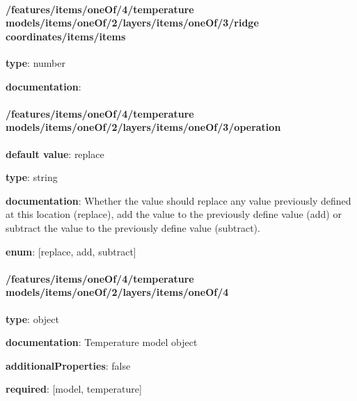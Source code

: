 \begin{itemized}
\begin{itemized}
\paragraph{/features/items/oneOf/4/temperature models/items/oneOf/2/layers/items/oneOf/3/ridge coordinates/items/items} \begin{itemized}
\item {\bf type}: number
\end{itemized}\item {\bf documentation}: 
\end{itemized}\end{itemized}\paragraph{/features/items/oneOf/4/temperature models/items/oneOf/2/layers/items/oneOf/3/operation} \begin{itemized}
\item {\bf default value}: replace
\item {\bf type}: string
\item {\bf documentation}: Whether the value should replace any value previously defined at this location (replace), add the value to the previously define value (add) or subtract the value to the previously define value (subtract).
\item {\bf enum}: [replace, add, subtract]\end{itemized}\paragraph{/features/items/oneOf/4/temperature models/items/oneOf/2/layers/items/oneOf/4} \begin{itemized}
\item {\bf type}: object
\item {\bf documentation}: Temperature model object
\item {\bf additionalProperties}: false
\item {\bf required}: [model, temperature]\end{itemized}
